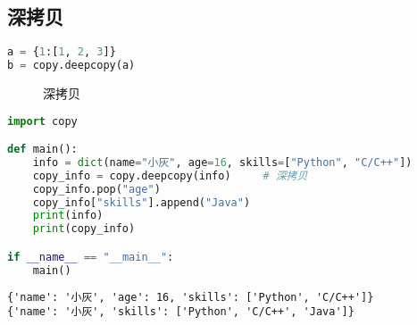 \vspace{0.5cm}

\subsection{深拷贝}

\vspace{-0.5cm}

\begin{lstlisting}[language=Python]
a = {1:[1, 2, 3]}
b = copy.deepcopy(a)
\end{lstlisting}

\begin{figure}[H]
	\centering
	\caption{深拷贝}
\end{figure}

\vspace{0.5cm}


\begin{lstlisting}[language=Python]
import copy

def main():
    info = dict(name="小灰", age=16, skills=["Python", "C/C++"])
    copy_info = copy.deepcopy(info)     # 深拷贝
    copy_info.pop("age")
    copy_info["skills"].append("Java")
    print(info)
    print(copy_info)

if __name__ == "__main__":
    main()
\end{lstlisting}

\begin{tcolorbox}
	\begin{verbatim}
{'name': '小灰', 'age': 16, 'skills': ['Python', 'C/C++']}
{'name': '小灰', 'skills': ['Python', 'C/C++', 'Java']}
\end{verbatim}
\end{tcolorbox}

\newpage


